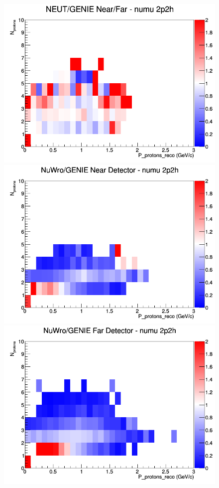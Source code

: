 \begin{figure}[h]
\endminipage
{}
\includegraphics[width=\linewidth]{eff_N_P/FGT/protons/ratios/2p2h_NEUT_GENIE_numu_NF_N_P.png}
\endminipage
\newline
{}
\includegraphics[width=\linewidth]{eff_N_P/FGT/protons/ratios/2p2h_NuWro_GENIE_numu_near_N_P.png}
\endminipage
{}
\includegraphics[width=\linewidth]{eff_N_P/FGT/protons/ratios/2p2h_NuWro_GENIE_numu_far_N_P.png}

\end{figure}
